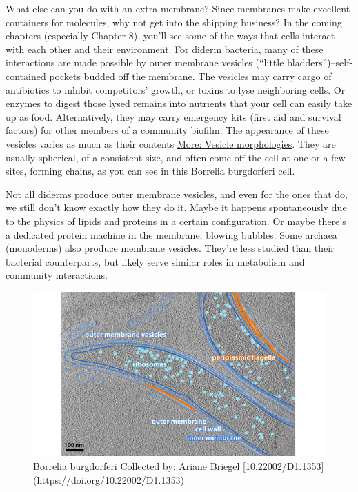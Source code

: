 \documentclass[]{tufte-book}
\begin{document}
What else can you do with an extra membrane? Since membranes make
excellent containers for molecules, why not get into the shipping
business? In the coming chapters (especially Chapter 8), you'll see some
of the ways that cells interact with each other and their environment.
For diderm bacteria, many of these interactions are made possible by
outer membrane vesicles (``little bladders'')--self-contained pockets
budded off the membrane. The vesicles may carry cargo of antibiotics to
inhibit competitors' growth, or toxins to lyse neighboring cells. Or
enzymes to digest those lysed remains into nutrients that your cell can
easily take up as food. Alternatively, they may carry emergency kits
(first aid and survival factors) for other members of a community
biofilm. The appearance of these vesicles varies as much as their
contents \protect\hyperlink{Vesicle_morphologies}{More: Vesicle
morphologies}. They are usually spherical, of a consistent size, and
often come off the cell at one or a few sites, forming chains, as you
can see in this Borrelia burgdorferi cell.

Not all diderms produce outer membrane vesicles, and even for the ones
that do, we still don't know exactly how they do it. Maybe it happens
spontaneously due to the physics of lipids and proteins in a certain
configuration. Or maybe there's a dedicated protein machine in the
membrane, blowing bubbles. Some archaea (monoderms) also produce
membrane vesicles. They're less studied than their bacterial
counterparts, but likely serve similar roles in metabolism and community
interactions.

\begin{figure}
\includegraphics{img/2_4_Bburgdorferi} \caption[Borrelia burgdorferi Collected by]{Borrelia burgdorferi Collected by: Ariane Briegel [10.22002/D1.1353](https://doi.org/10.22002/D1.1353)}\label{fig:unnamed-chunk-11}
\end{figure}
\end{document}
